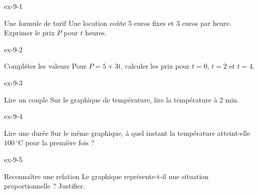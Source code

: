 \clearpage{}
\begin{blocLivre}{ex-9-1}\begin{exercice}[1]{Une formule de tarif}
Une location coûte 5 euros fixes et 3 euros par heure. Exprimer le prix $P$ pour $t$ heures.
\end{exercice}\end{blocLivre}
\begin{blocLivre}{ex-9-2}\begin{exercice}[1]{Compléter les valeurs}
Pour $P=5+3t$, calculer les prix pour $t=0$, $t=2$ et $t=4$.
\end{exercice}\end{blocLivre}
\begin{blocLivre}{ex-9-3}\begin{exercice}[1]{Lire un couple}
Sur le graphique de température, lire la température à 2 min.
\label{fig-ex-9-3}
\end{exercice}\end{blocLivre}
\begin{blocLivre}{ex-9-4}\begin{exercice}[1]{Lire une durée}
Sur le même graphique, à quel instant la température atteint-elle $100\,^\circ$C pour la première fois ?
\label{fig-ex-9-4}
\end{exercice}\end{blocLivre}
\begin{blocLivre}{ex-9-5}\begin{exercice}[1]{Reconnaître une relation}
Le graphique représente-t-il une situation proportionnelle ? Justifier.
\label{fig-ex-9-5}
\end{exercice}\end{blocLivre}

